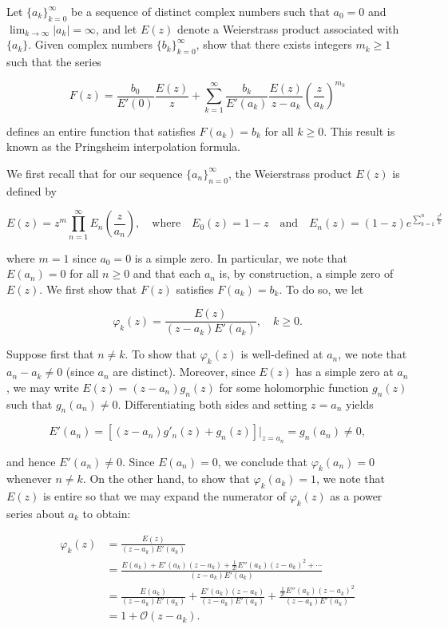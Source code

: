 Let $\{a_k\}_{k = 0}^{\infty}$ be a sequence of distinct complex numbers such that $a_0 = 0$ and 
$\lim_{k \to \infty} |a_k| = \infty$, and let $E(z)$ denote a Weierstrass product associated with $\{a_k\}$. Given 
complex numbers $\{b_k\}_{k = 0}^{\infty}$, show that there exists integers $m_k \ge 1$ such that the series

$$
F(z) = \frac{b_0}{E'(0)} \frac{E(z)}{z} + \sum_{k=1}^{\infty} \frac{b_k}{E'(a_k)} \frac{E(z)}{z - a_k} \left(\frac{z}{a_k} \right)^{m_k}
$$

defines an entire function that satisfies $F(a_k) = b_k$ for all $k \ge 0$. This result is known as the Pringsheim 
interpolation formula.

\begin{solution}
    We first recall that for our sequence $\{a_n\}_{n=0}^{\infty}$, the Weierstrass product $E(z)$ is defined by

    $$
    E(z) = z^m \prod_{n=1}^{\infty} E_n\left(\frac{z}{a_n}\right), \quad 
      \text{where} \quad E_0(z) = 1 - z \quad 
      \text{and} \quad E_n(z) = \left(1 - z\right) e^{\sum_{k=1}^n \frac{z^k}{k}}
    $$

    where $m = 1$ since $a_0 = 0 $ is a simple zero. In particular, we note that $E(a_n) = 0$ for all $n \ge 0$ and that 
    each $a_n$ is, by construction, a simple zero of $E(z)$. We first show that $F(z)$ satisfies $F(a_k) = b_k$. To do 
    so, we let

    $$
    \varphi_k(z) = \frac{E(z)}{(z - a_k) E'(a_k)}, \quad k \ge 0.
    $$

    Suppose first that $n \neq k$. To show that $\varphi_k(z)$ is well-defined at $a_n$, we note that $a_n - a_k \neq 0$ (since $a_n$ are 
    distinct). Moreover, since $E(z)$ has a simple zero at $a_n$, we may write $E(z) = (z - a_n) g_n(z)$ for some 
    holomorphic function $g_n(z)$ such that $g_n(a_n) \neq 0$. Differentiating both sides and setting $z = a_n$ yields

    $$
    E'(a_n) = \left[(z - a_n) g'_n(z) + g_n(z)\right] \big\vert_{z = a_n} = g_n(a_n) \neq 0,
    $$

    and hence $E'(a_n) \neq 0$. Since $E(a_n) = 0$, we conclude that $\varphi_k(a_n) = 0$ whenever $n \neq k$.
    On the other hand, to show that $\varphi_k(a_k) = 1$, we note that $E(z)$ is entire so that we may expand the 
    numerator of $\varphi_k(z)$ as a power series about $a_k$ to obtain:

    \begin{align*}
      \varphi_k(z) &= \frac{E(z)}{(z - a_k) E'(a_k)} \\
                   &= \frac{E(a_k) + E'(a_k)(z - a_k) + \frac{1}{2!}E''(a_k)(z - a_k)^2 + \cdots}{(z - a_k) E'(a_k)} \\
                   &= \frac{E(a_k)}{(z - a_k)E'(a_k)} 
                    + \frac{E'(a_k)(z - a_k)}{(z - a_k)E'(a_k)} 
                    + \frac{\frac{1}{2!}E''(a_k)(z - a_k)^2}{(z - a_k)E'(a_k)} \\
                   &= 1 + \mathcal{O}(z - a_k).
    \end{align*}


\end{solution}
